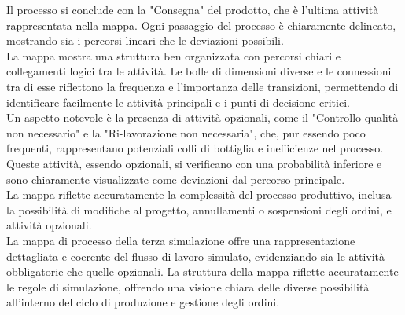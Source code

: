 \documentclass{article}
\begin{document}
Il processo si conclude con la "Consegna" del prodotto, che è l'ultima attività rappresentata nella mappa. Ogni passaggio del processo è chiaramente delineato, mostrando sia i percorsi lineari che le deviazioni possibili.\\
La mappa mostra una struttura ben organizzata con percorsi chiari e collegamenti logici tra le attività. Le bolle di dimensioni diverse e le connessioni tra di esse riflettono la frequenza e l'importanza delle transizioni, permettendo di identificare facilmente le attività principali e i punti di decisione critici.\\
Un aspetto notevole è la presenza di attività opzionali, come il "Controllo qualità non necessario" e la "Ri-lavorazione non necessaria", che, pur essendo poco frequenti, rappresentano potenziali colli di bottiglia e inefficienze nel processo. Queste attività, essendo opzionali, si verificano con una probabilità inferiore e sono chiaramente visualizzate come deviazioni dal percorso principale.\\
La mappa riflette accuratamente la complessità del processo produttivo, inclusa la possibilità di modifiche al progetto, annullamenti o sospensioni degli ordini, e attività opzionali.\\
La mappa di processo della terza simulazione offre una rappresentazione dettagliata e coerente del flusso di lavoro simulato, evidenziando sia le attività obbligatorie che quelle opzionali. La struttura della mappa riflette accuratamente le regole di simulazione, offrendo una visione chiara delle diverse possibilità all'interno del ciclo di produzione e gestione degli ordini.
\end{document}
